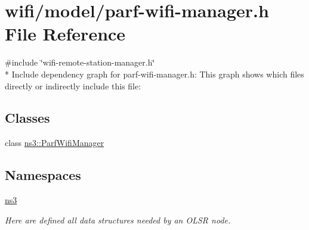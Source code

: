\hypertarget{parf-wifi-manager_8h}{}\section{wifi/model/parf-\/wifi-\/manager.h File Reference}
\label{parf-wifi-manager_8h}
{\ttfamily \#include \char`\"{}wifi-\/remote-\/station-\/manager.\+h\char`\"{}}\\*
Include dependency graph for parf-\/wifi-\/manager.h\+:
This graph shows which files directly or indirectly include this file\+:
\subsection*{Classes}
\begin{DoxyCompactItemize}
\item 
class \hyperlink{classns3_1_1ParfWifiManager}{ns3\+::\+Parf\+Wifi\+Manager}
\end{DoxyCompactItemize}
\subsection*{Namespaces}
\begin{DoxyCompactItemize}
\item 
 \hyperlink{namespacens3}{ns3}
\begin{DoxyCompactList}\small\item\em Here are defined all data structures needed by an O\+L\+SR node. \end{DoxyCompactList}\end{DoxyCompactItemize}
